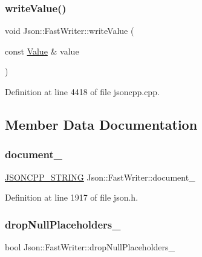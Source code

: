 \subsubsection{\texorpdfstring{write\+Value()}{writeValue()}\hspace{0.1cm}{\footnotesize\ttfamily [2/2]}}
{\footnotesize\ttfamily void Json\+::\+Fast\+Writer\+::write\+Value (\begin{DoxyParamCaption}\item[{const \hyperlink{class_json_1_1_value}{Value} \&}]{value }\end{DoxyParamCaption})\hspace{0.3cm}{\ttfamily [private]}}



Definition at line 4418 of file jsoncpp.\+cpp.



\subsection{Member Data Documentation}
\hypertarget{class_json_1_1_fast_writer_a5e08c44579db8704dba1ebe37d39fdba}{}\label{class_json_1_1_fast_writer_a5e08c44579db8704dba1ebe37d39fdba} 
\subsubsection{\texorpdfstring{document\+\_\+}{document\_}}
{\footnotesize\ttfamily \hyperlink{config_8h_a1e723f95759de062585bc4a8fd3fa4be}{J\+S\+O\+N\+C\+P\+P\+\_\+\+S\+T\+R\+I\+NG} Json\+::\+Fast\+Writer\+::document\+\_\+\hspace{0.3cm}{\ttfamily [private]}}



Definition at line 1917 of file json.\+h.

\hypertarget{class_json_1_1_fast_writer_a97e9d4ff84b59a48756dcc27a71b5904}{}\label{class_json_1_1_fast_writer_a97e9d4ff84b59a48756dcc27a71b5904} 
\subsubsection{\texorpdfstring{drop\+Null\+Placeholders\+\_\+}{dropNullPlaceholders\_}}
{\footnotesize\ttfamily bool Json\+::\+Fast\+Writer\+::drop\+Null\+Placeholders\+\_\+\hspace{0.3cm}{\ttfamily [private]}}




